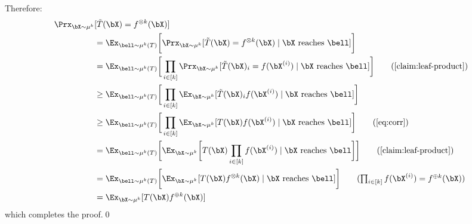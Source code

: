 \documentclass[11pt]{article}
\newcommand{\lnote}[1]{\footnote{{\bf \color{blue}Li-Yang}: {#1}}}
\begin{document}
Therefore:
    \begin{align*}
    \Prx_{\bX \sim \mu^{k}}&[\tilde{T}(\bX)= f^{\otimes k}(\bX)]\\
        &= \Ex_{\bell\sim\mu^{k}(T)}\bigg[\Prx_{\bX\sim\mu^{k}}[\tilde{T}(\bX)=f^{\otimes k}(\bX)\mid \bX\text{ reaches }\bell]\bigg]\\
        &=\Ex_{\bell\sim\mu^{k}(T)}\bigg[\prod_{i\in [k]}\Prx_{\bX\sim\mu^{k}}[\tilde{T}(\bX)_i=f(\bX^{(i)})\mid \bX\text{ reaches }\bell]\bigg]\tag{\Cref{claim:leaf-product}}\\
        &\ge \Ex_{\bell\sim\mu^{k}(T)}\bigg[\prod_{i\in [k]}\Ex_{\bX\sim\mu^{k}}[\Tilde{T}(\bX)_if(\bX^{(i)})\mid \bX\text{ reaches }\bell]\bigg]\\
        &\ge \Ex_{\bell\sim\mu^{k}(T)}\bigg[\prod_{i\in [k]}\Ex_{\bX\sim\mu^{k}}[T(\bX)f(\bX^{(i)})\mid \bX\text{ reaches }\bell]\bigg]\tag{\Cref{eq:corr}}\\
        &=\Ex_{\bell\sim\mu^{k}(T)}\bigg[\Ex_{\bX\sim\mu^{k}}\bigg[T(\bX)\prod_{i\in [k]}f(\bX^{(i)})\mid \bX\text{ reaches }\bell\bigg]\bigg]\tag{\Cref{claim:leaf-product}}\\
        &=\Ex_{\bell\sim\mu^{k}(T)}\bigg[\Ex_{\bX\sim\mu^{k}}[T(\bX)f^{\otimes k}(\bX)\mid \bX\text{ reaches }\bell]\bigg]\tag{$\prod_{i\in [k]}f(\bX^{(i)})=f^{\oplus k}(\bX)$}\\
        &=\Ex_{\bX \sim \mu^{k}}[T(\bX)f^{\oplus k}(\bX)]
    \end{align*}
    which completes the proof.\hfill\qed

\end{document}
